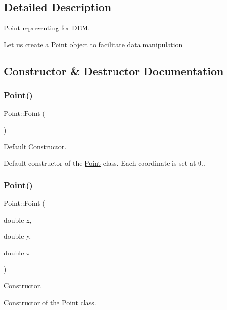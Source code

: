 \subsection{Detailed Description}
\hyperlink{classPoint}{Point} representing for \hyperlink{classDEM}{D\+EM}. 

Let us create a \hyperlink{classPoint}{Point} object to facilitate data manipulation 

\subsection{Constructor \& Destructor Documentation}
\mbox{\label{classPoint_ad92f2337b839a94ce97dcdb439b4325a}} 
\subsubsection{\texorpdfstring{Point()}{Point()}\hspace{0.1cm}{\footnotesize\ttfamily [1/2]}}
{\footnotesize\ttfamily Point\+::\+Point (\begin{DoxyParamCaption}{ }\end{DoxyParamCaption})}



Default Constructor. 

Default constructor of the \hyperlink{classPoint}{Point} class. Each coordinate is set at 0.. \mbox{\label{classPoint_a4d43f5247afe8c85c6da1aa39dbcc738}} 
\subsubsection{\texorpdfstring{Point()}{Point()}\hspace{0.1cm}{\footnotesize\ttfamily [2/2]}}
{\footnotesize\ttfamily Point\+::\+Point (\begin{DoxyParamCaption}\item[{double}]{x,  }\item[{double}]{y,  }\item[{double}]{z }\end{DoxyParamCaption})}



Constructor. 

Constructor of the \hyperlink{classPoint}{Point} class.



